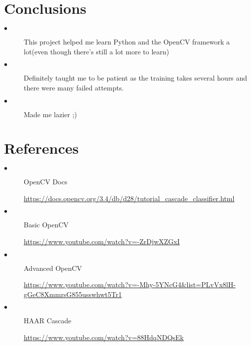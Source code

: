 \documentclass{article}
\begin{document}
\section{Conclusions}
\begin{description}
\item[$\bullet$]This project helped me learn Python and the OpenCV
framework a lot(even though there’s still a lot more to
learn)

\item[$\bullet$] Definitely taught me to be patient as the training takes
several hours and there were many failed attempts.

\item[$\bullet$]Made me lazier ;)
\end{description}

\section{References}
\begin{description}
\item[$\bullet$] OpenCV Docs

\url{https://docs.opencv.org/3.4/db/d28/tutorial\_cascade\_classifier.html}

\item[$\bullet$] Basic OpenCV

\url{https://www.youtube.com/watch?v=-ZrDjwXZGxI}

\item[$\bullet$]Advanced OpenCV

\url{https://www.youtube.com/watch?v=-Mhy-5YNcG4&list=PLvVx8lH-gGeC8XmmrsG855usswhwt5Tr1}

\item[$\bullet$]HAAR Cascade

\url{https://www.youtube.com/watch?v=88HdqNDQsEk}


\end{description}
\end{document}
